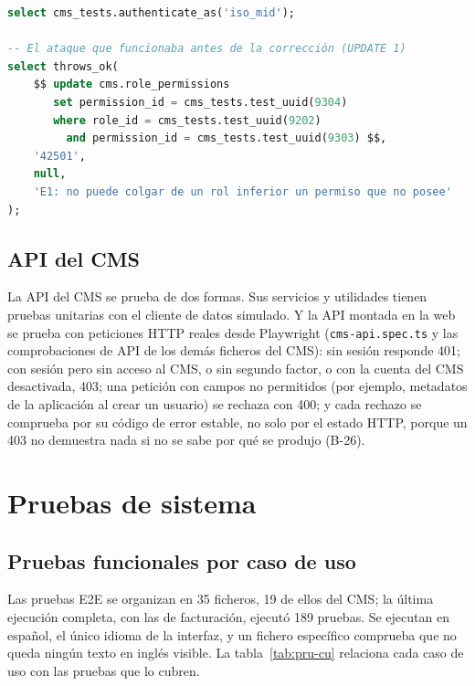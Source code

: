 \begin{lstlisting}[style=pymekitpru, language=SQL, caption={Regresión de la escalada por \texttt{UPDATE} sin \texttt{WITH CHECK} (\texttt{cms-isolation.test.sql}).}, label={lst:pru-ataque}]
select cms_tests.authenticate_as('iso_mid');

-- El ataque que funcionaba antes de la corrección (UPDATE 1)
select throws_ok(
    $$ update cms.role_permissions
       set permission_id = cms_tests.test_uuid(9304)
       where role_id = cms_tests.test_uuid(9202)
         and permission_id = cms_tests.test_uuid(9303) $$,
    '42501',
    null,
    'E1: no puede colgar de un rol inferior un permiso que no posee'
);
\end{lstlisting}

\subsection{API del CMS}
\label{sec:pru-api}

La API del CMS se prueba de dos formas. Sus servicios y utilidades tienen
pruebas unitarias con el cliente de datos simulado. Y la API montada en la
web se prueba con peticiones HTTP reales desde Playwright
(\texttt{cms-api.spec.ts} y las comprobaciones de API de los demás ficheros
del CMS): sin sesión responde 401; con sesión pero sin acceso al CMS, o sin
segundo factor, o con la cuenta del CMS desactivada, 403; una petición con
campos no permitidos (por ejemplo, metadatos de la aplicación al crear un
usuario) se rechaza con 400; y cada rechazo se comprueba por su código de
error estable, no solo por el estado HTTP, porque un 403 no demuestra nada si
no se sabe por qué se produjo (B-26).

\section{Pruebas de sistema}
\label{sec:pru-sistema}

\subsection{Pruebas funcionales por caso de uso}
\label{sec:pru-funcionales}

Las pruebas E2E se organizan en 35 ficheros, 19 de ellos del CMS; la última
ejecución completa, con las de facturación, ejecutó 189 pruebas. Se ejecutan en español, el único idioma
de la interfaz, y un fichero específico comprueba que no queda ningún texto
en inglés visible. La tabla~\ref{tab:pru-cu} relaciona cada caso de uso con
las pruebas que lo cubren.

